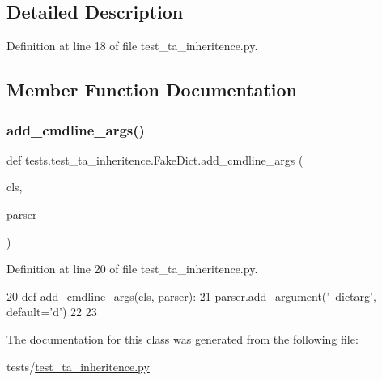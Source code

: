 \subsection{Detailed Description}


Definition at line 18 of file test\+\_\+ta\+\_\+inheritence.\+py.



\subsection{Member Function Documentation}
\mbox{\label{classtests_1_1test__ta__inheritence_1_1FakeDict_a75f0777e5a33a01975af1f8d40b79faa}} 
\subsubsection{\texorpdfstring{add\+\_\+cmdline\+\_\+args()}{add\_cmdline\_args()}}
{\footnotesize\ttfamily def tests.\+test\+\_\+ta\+\_\+inheritence.\+Fake\+Dict.\+add\+\_\+cmdline\+\_\+args (\begin{DoxyParamCaption}\item[{}]{cls,  }\item[{}]{parser }\end{DoxyParamCaption})}



Definition at line 20 of file test\+\_\+ta\+\_\+inheritence.\+py.


\begin{DoxyCode}
20     \textcolor{keyword}{def }\hyperlink{namespaceparlai_1_1agents_1_1drqa_1_1config_a62fdd5554f1da6be0cba185271058320}{add\_cmdline\_args}(cls, parser):
21         parser.add\_argument(\textcolor{stringliteral}{'--dictarg'}, default=\textcolor{stringliteral}{'d'})
22 
23 
\end{DoxyCode}


The documentation for this class was generated from the following file\+:\begin{DoxyCompactItemize}
\item 
tests/\hyperlink{test__ta__inheritence_8py}{test\+\_\+ta\+\_\+inheritence.\+py}\end{DoxyCompactItemize}
